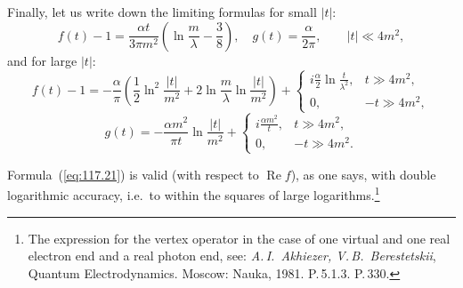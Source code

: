 Finally, let us write down the limiting formulas for small $|t|$:
\begin{equation}
f(t) - 1 = \frac{\alpha t}{3\pi m^2}\!\left(\ln\frac{m}{\lambda} - \frac{3}{8}\right), \quad g(t) = \frac{\alpha}{2\pi}, \qquad |t| \ll 4m^2,
\label{eq:117.20}
\end{equation}
and for large $|t|$:
\begin{equation}
f(t) - 1 = -\frac{\alpha}{\pi}\left(\frac{1}{2}\ln^2\frac{|t|}{m^2} + 2\ln\frac{m}{\lambda}\ln\frac{|t|}{m^2}\right) + \begin{cases} \displaystyle i\frac{\alpha}{2}\ln\frac{t}{\lambda^2}, & t \gg 4m^2, \\[6pt] 0, & -t \gg 4m^2, \end{cases}
\label{eq:117.21}
\end{equation}
\begin{equation}
g(t) = -\frac{\alpha m^2}{\pi t}\ln\frac{|t|}{m^2} + \begin{cases} \displaystyle i\frac{\alpha m^2}{t}, & t \gg 4m^2, \\[6pt] 0, & -t \gg 4m^2. \end{cases}
\label{eq:117.22}
\end{equation}

Formula~(\ref{eq:117.21}) is valid (with respect to $\operatorname{Re} f$), as one says, with double logarithmic accuracy, i.e.\ to within the squares of large logarithms.\footnote{The expression for the vertex operator in the case of one virtual and one real electron end and a real photon end, see: \emph{A.\,I.~Akhiezer, V.\,B.~Berestetskii}, Quantum Electrodynamics. Moscow: Nauka, 1981. P.\,5.1.3. P.\,330.}
